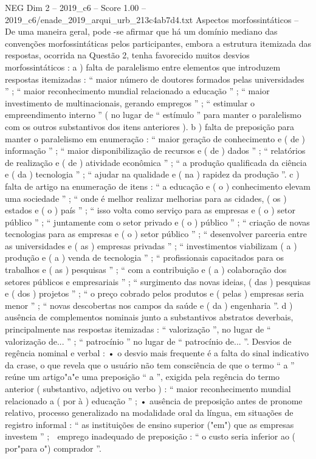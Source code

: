 \begin{textsample}{NEG Dim 2 – 2019\_c6 – Score 1.00 – 2019\_c6/enade\_2019\_arqui\_urb\_213c4ab7d4.txt}
Aspectos morfossintáticos – De uma maneira geral, pode -se afirmar que há um domínio mediano das convenções morfossintáticas pelos participantes, embora a estrutura itemizada das respostas, ocorrida na Questão 2, tenha favorecido muitos desvios morfossintáticos : a ) falta de paralelismo entre elementos que introduzem respostas itemizadas : “ maior número de doutores formados pelas universidades ” ; “ maior reconhecimento mundial relacionado a educação ” ; “ maior investimento de multinacionais, gerando empregos ” ; “ estimular o empreendimento interno ” ( no lugar de “ estímulo ” para manter o paralelismo com os outros substantivos dos itens anteriores ). b ) falta de preposição para manter o paralelismo em enumeração : “ maior geração de conhecimento e ( de ) informação ” ; “ maior disponibilização de recursos e ( de ) dados ” ; “ relatórios de realização e ( de ) atividade econômica ” ; “ a produção qualificada da ciência e ( da ) tecnologia ” ; “ ajudar na qualidade e ( na ) rapidez da produção ”. c ) falta de artigo na enumeração de itens : “ a educação e ( o ) conhecimento elevam uma sociedade ” ; “ onde é melhor realizar melhorias para as cidades, ( os ) estados e ( o ) país ” ; “ isso volta como serviço para as empresas e ( o ) setor público ” ; “ juntamente com o setor privado e ( o ) público ” ; “ criação de novas tecnologias para as empresas e ( o ) setor público ” ; “ desenvolver parceria entre as universidades e ( as ) empresas privadas ” ; “ investimentos viabilizam ( a ) produção e ( a ) venda de tecnologia ” ; “ profissionais capacitados para os trabalhos e ( as ) pesquisas ” ; “ com a contribuição e ( a ) colaboração dos setores públicos e empresariais ” ; “ surgimento das novas ideias, ( das ) pesquisas e ( dos ) projetos ” ; “ o preço cobrado pelos produtos e ( pelas ) empresas seria menor ” ; “ novas descobertas nos campos da saúde e ( da ) engenharia ”. d ) ausência de complementos nominais junto a substantivos abstratos deverbais, principalmente nas respostas itemizadas : “ valorização ”, no lugar de “ valorização de... ” ; “ patrocínio ” no lugar de “ patrocínio de... ”.
Desvios de regência nominal e verbal : • o desvio mais frequente é a falta do sinal indicativo da crase, o que revela que o usuário não tem consciência de que o termo “ a ” reúne um artigo"a"e uma preposição “ a ”, exigida pela regência do termo anterior ( substantivo, adjetivo ou verbo ) : “ maior reconhecimento mundial relacionado a ( por à ) educação ” ; • ausência de preposição antes de pronome relativo, processo generalizado na modalidade oral da língua, em situações de registro informal : “ as instituições de ensino superior ("em") que as empresas investem ” ;  emprego inadequado de preposição : “ o custo seria inferior ao ( por"para o") comprador ”.

\end{textsample}
